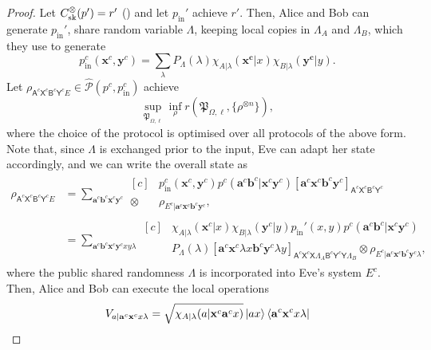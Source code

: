\documentclass[10pt, a4paper]{article}
\numberwithin{equation}{section} %
\theoremstyle{definition}
\theoremstyle{plain}
\newcommand{\?}{\mathrel{?}} %
\newcommand{\cvec}[1]{\boldsymbol{\mathbf{#1}}}    %
\newcommand{\crv}[1]{\mathsf{#1}}
\newcommand{\proj}[2][]{{[#2]}_{#1}}
\newcommand{\compatstates}[3][]{\hat{\mathcal{P}}#1(#2,#3)}
\newcommand{\proto}[2][_{\Omega,\ell}]{\mathfrak{#2}#1}
\newcommand{\prin}[1][p]{#1_{\mathrm{in}}}
\newcommand{\sk}{\rm sk}
\begin{document}
\begin{proof}
               Let \(C_{\sk}^{\otimes}(p') = r'\) () and let \(\prin'\) achieve \(r'\). Then, Alice and Bob can generate \(\prin'\), share random variable \(\Lambda\), keeping local copies in \(\Lambda_A\) and \(\Lambda_B\), which they use to generate
               \[ \prin^c(\cvec{x}^c, \cvec{y}^c) = \sum_{\lambda} P_{\Lambda}(\lambda) \chi_{A|\lambda}(\cvec{x^c}|x)\chi_{B|\lambda}(\cvec{y^c}|y). \]
               Let \(\rho_{\crv{A}^c\crv{X}^c \crv{B}^c\crv{Y}^c E} \in \compatstates{p^c}{\prin^c}\) achieve
               \[ \sup_{\proto{P}} \inf_{\rho} r(\proto{P}, \{\rho^{\otimes n}\}), \]
               where the choice of the protocol is optimised over all protocols of the above form. Note that, since \(\Lambda\) is exchanged prior to the input, Eve can adapt her state accordingly, and we can write the overall state as
               \begin{align*}
                 \rho_{\crv{A}^c\crv{X}^c \crv{B}^c\crv{Y}^c E} &= \sum_{\cvec{a}^c\cvec{b}^c \cvec{x}^c\cvec{y}^c} \begin{aligned}[c]
          & \prin^c(\cvec{x}^c,\cvec{y}^c) p^c(\cvec{a}^c\cvec{b}^c|\cvec{x}^c\cvec{y}^c) \proj[\crv{A}^c\crv{X}^c \crv{B}^c\crv{Y}^c]{\cvec{a}^c\cvec{x}^c\cvec{b}^c\cvec{y}^c} \\
                   \otimes & \rho_{E^c|\cvec{a}^c\cvec{x}^c \cvec{b}^c\cvec{y}^c},
                 \end{aligned} \\
                                                                &= \sum_{\cvec{a}^c\cvec{b}^c \cvec{x}^c\cvec{y}^c xy\lambda} \begin{aligned}[c]
          & \chi_{A|\lambda}(\cvec{x}^c|x) \chi_{B|\lambda}(\cvec{y}^c|y) \prin'(x,y) p^c(\cvec{a}^c\cvec{b}^c|\cvec{x}^c\cvec{y}^c) \\
          & P_{\Lambda}(\lambda) \proj[\crv{A}^c\crv{X}^c\crv{X}\Lambda_A \crv{B}^c\crv{Y}^c\crv{Y}\Lambda_B]{\cvec{a}^c\cvec{x}^c\lambda{x} \cvec{b}^c\cvec{y}^c\lambda{y}} \otimes \rho_{E^c|\cvec{a}^c\cvec{x}^c \cvec{b}^c\cvec{y}^c\lambda},
                 \end{aligned}
                 \end{align*}
                 where the public shared randomness \(\Lambda\) is incorporated into Eve's system \(E^c\). Then, Alice and Bob can execute the local operations
                 \begin{align*}
                   V_{a|\cvec{a}^c\cvec{x}^c x\lambda} &= \sqrt{\chi_{A|\lambda}(a|\cvec{x}^c\cvec{a}^cx)} \ket{ax}\bra{\cvec{a}^c\cvec{x}^c x\lambda} \\

\end{align*}
\end{proof}
\end{document}
